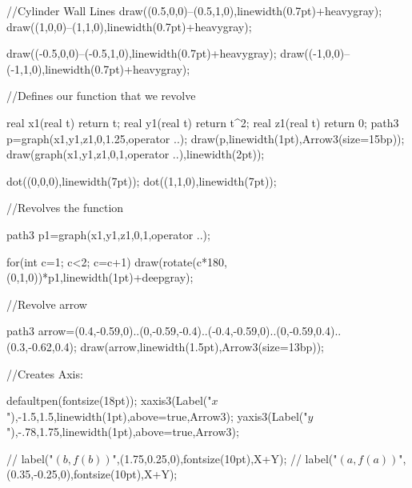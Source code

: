     	
   	//Cylinder Wall Lines
   		draw((0.5,0,0)--(0.5,1,0),linewidth(0.7pt)+heavygray);
   		draw((1,0,0)--(1,1,0),linewidth(0.7pt)+heavygray);
   		
   		draw((-0.5,0,0)--(-0.5,1,0),linewidth(0.7pt)+heavygray);
   		draw((-1,0,0)--(-1,1,0),linewidth(0.7pt)+heavygray);
    
    //Defines our function that we revolve
    
    	real x1(real t) {return t;}
		real y1(real t) {return t^2;}
		real z1(real t) {return 0;}
    	path3 p=graph(x1,y1,z1,0,1.25,operator ..);
        draw(p,linewidth(1pt),Arrow3(size=15bp));
        draw(graph(x1,y1,z1,0,1,operator ..),linewidth(2pt));
        
        dot((0,0,0),linewidth(7pt));
        dot((1,1,0),linewidth(7pt));
        
    //Revolves the function
    
        
		path3 p1=graph(x1,y1,z1,0,1,operator ..);
        
        for(int c=1; c<2; c=c+1)
        {
        	draw(rotate(c*180,(0,1,0))*p1,linewidth(1pt)+deepgray);
        }
        
    //Revolve arrow
        
    	path3 arrow=(0.4,-0.59,0)..(0,-0.59,-0.4)..(-0.4,-0.59,0)..(0,-0.59,0.4)..(0.3,-0.62,0.4);
		draw(arrow,linewidth(1.5pt),Arrow3(size=13bp));

	//Creates Axis:

    defaultpen(fontsize(18pt));
    xaxis3(Label("$x$"),-1.5,1.5,linewidth(1pt),above=true,Arrow3);
    yaxis3(Label("$y$"),-.78,1.75,linewidth(1pt),above=true,Arrow3);
    
   // label("$(b,f(b))$",(1.75,0.25,0),fontsize(10pt),X+Y);
   // label("$(a,f(a))$",(0.35,-0.25,0),fontsize(10pt),X+Y);